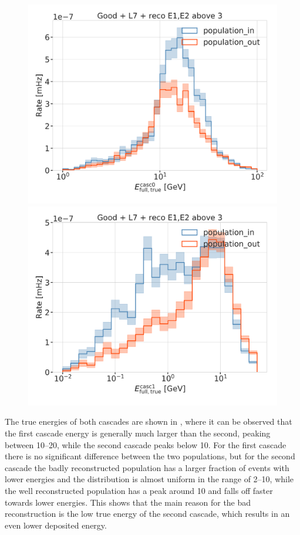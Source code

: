 \begin{figure}[h]
    \centering
    \includegraphics[width=0.49\linewidth]{figures/results/190607/second_population/casc0_energy.png}
    \includegraphics[width=0.49\linewidth]{figures/results/190607/second_population/casc1_energy.png}
    \caption[]{}
\end{figure}

The true energies of both cascades are shown in , where it can be observed that the first cascade energy is generally much larger than the second, peaking between \SIrange[range-phrase={~and~}]{10}{20}{\gev}, while the second cascade peaks below \SI{10}{\gev}. For the first cascade there is no significant difference between the two populations, but for the second cascade the badly reconstructed population has a larger fraction of events with lower energies and the distribution is almost uniform in the range of \SIrange{2}{10}{\gev}, while the well reconstructed population has a peak around \SI{10}{\gev} and falls off faster towards lower energies. This shows that the main reason for the bad reconstruction is the low true energy of the second cascade, which results in an even lower deposited energy.


